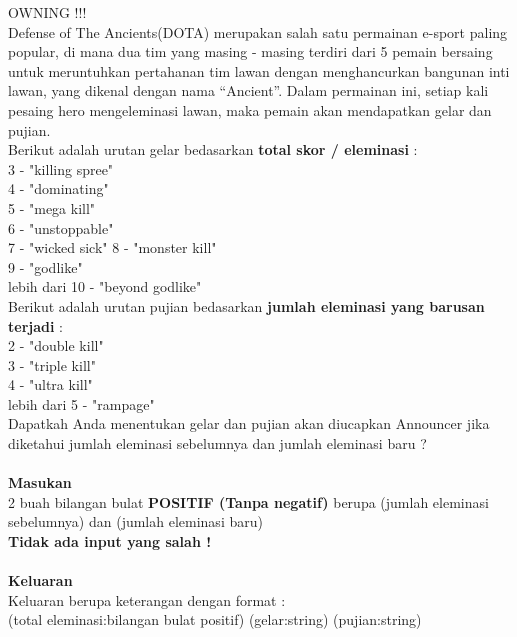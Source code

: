 \newpage
\begin{permasalahan}{OWNING !!!}\\
\label{prob:OWNING}
Defense of The Ancients(DOTA) merupakan salah satu permainan e-sport paling popular, di mana dua tim yang masing - masing terdiri dari 5 pemain bersaing untuk meruntuhkan pertahanan tim lawan dengan menghancurkan bangunan inti lawan, yang dikenal dengan nama “Ancient”. Dalam permainan ini, setiap kali pesaing hero mengeleminasi lawan, maka pemain akan mendapatkan gelar dan pujian.\\

Berikut adalah urutan gelar bedasarkan \textbf{total skor / eleminasi} :\\
         3 -  "killing spree" \\
         4 -  "dominating" \\ 
         5 - "mega kill" \\
         6 -  "unstoppable" \\
         7 - "wicked sick"
         8 -  "monster kill" \\
         9 -  "godlike" \\
         lebih dari 10 -  "beyond godlike" \\

Berikut adalah urutan pujian bedasarkan \textbf{jumlah eleminasi yang barusan terjadi} :\\
         2 -  "double kill" \\ 
         3 - "triple kill" \\
         4 -  "ultra kill" \\
				 lebih dari 5 - "rampage" \\
				
	Dapatkah Anda menentukan gelar dan pujian akan diucapkan Announcer jika diketahui jumlah eleminasi sebelumnya dan jumlah eleminasi baru ? \\\\
 
	\textbf{Masukan}\\
	2 buah bilangan bulat \textbf{POSITIF (Tanpa negatif)} berupa (jumlah eleminasi sebelumnya) dan (jumlah eleminasi baru) \\
	\textbf{Tidak ada input yang salah !}\\\\
	\textbf{Keluaran}\\
	Keluaran berupa keterangan dengan format :\\
	(total eleminasi:bilangan bulat positif) (gelar:string) (pujian:string) \\
	

\end{permasalahan}
